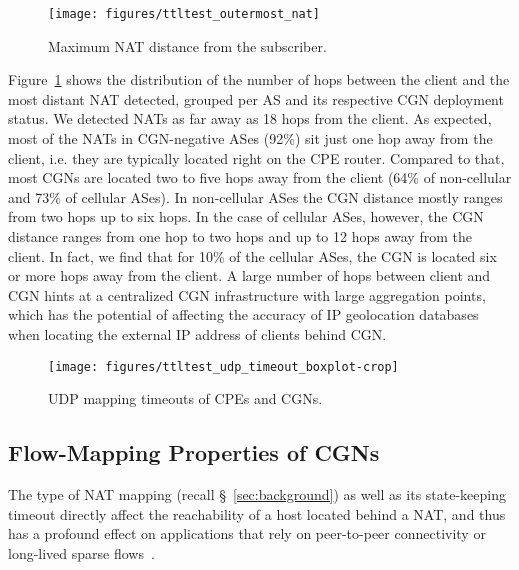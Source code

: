 \documentclass[10pt]{sig-alternate-05-2015}
\newcommand\xref[1]{\S~\ref{#1}}
\begin{document}
\begin{figure}
  \begin{center}
    \texttt{[image: figures/ttltest\_outermost\_nat]}
  \caption{Maximum NAT distance from the subscriber.}
    \label{fig:natdistance}
    \vspace{-1em}
  \end{center}
\end{figure}

Figure~\ref{fig:natdistance} shows the distribution of the number of hops 
between the client and the most distant NAT detected, grouped per AS and its 
respective CGN deployment status. We detected NATs as far away as 
18{} hops from the client. As expected, most of the NATs 
in CGN-negative ASes (92\%{}) 
sit just one hop away from the client, i.e. they are typically located right on 
the CPE router. Compared to that, most CGNs are located two to five hops 
away from the client (64\%{} of 
non-cellular and 73\%{} of cellular 
ASes). In non-cellular ASes the CGN distance mostly ranges from two hops up 
to six hops. In the case of cellular ASes, however, the CGN distance ranges 
from one hop to two hops and up to 12 hops away from the client. In fact, we 
find that for 10\%{} of the cellular ASes, 
the CGN is located six or more hops away from the client. A large number of 
hops between client and CGN hints at a centralized CGN infrastructure with 
large aggregation points, which has the potential of affecting the accuracy of 
IP geolocation databases when locating the external IP address of 
clients behind CGN.



\begin{figure}
  \begin{center}
    \texttt{[image: figures/ttltest\_udp\_timeout\_boxplot-crop]}
  \caption{UDP mapping timeouts of CPEs and CGNs.}
  \vspace{-1em}
    \label{fig:nattimeout}
  \end{center}
\end{figure}

\subsection{Flow-Mapping Properties of CGNs}
\label{sec:flowmappingprops}

The type of NAT mapping (recall \xref{sec:background}) as well as its
state-keeping timeout directly affect the reachability of a host
located behind a NAT, and thus has a profound effect on applications that rely
on peer-to-peer connectivity \cite{fordHolePunching, d2009measurement} or
long-lived sparse flows~\cite{Wang:2011:USM:2043164.2018479}.
\end{document}
